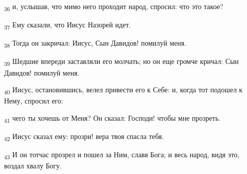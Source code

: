 \begin{tcolorbox}
\textsubscript{36} и, услышав, что мимо него проходит народ, спросил: что это такое?
\end{tcolorbox}
\begin{tcolorbox}
\textsubscript{37} Ему сказали, что Иисус Назорей идет.
\end{tcolorbox}
\begin{tcolorbox}
\textsubscript{38} Тогда он закричал: Иисус, Сын Давидов! помилуй меня.
\end{tcolorbox}
\begin{tcolorbox}
\textsubscript{39} Шедшие впереди заставляли его молчать; но он еще громче кричал: Сын Давидов! помилуй меня.
\end{tcolorbox}
\begin{tcolorbox}
\textsubscript{40} Иисус, остановившись, велел привести его к Себе: и, когда тот подошел к Нему, спросил его:
\end{tcolorbox}
\begin{tcolorbox}
\textsubscript{41} чего ты хочешь от Меня? Он сказал: Господи! чтобы мне прозреть.
\end{tcolorbox}
\begin{tcolorbox}
\textsubscript{42} Иисус сказал ему: прозри! вера твоя спасла тебя.
\end{tcolorbox}
\begin{tcolorbox}
\textsubscript{43} И он тотчас прозрел и пошел за Ним, славя Бога; и весь народ, видя это, воздал хвалу Богу.
\end{tcolorbox}
